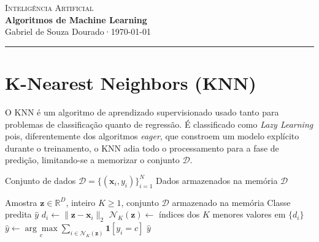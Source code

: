 \documentclass[12pt, a4paper]{article}
\theoremstyle{definition}
\theoremstyle{plain}
\theoremstyle{remark}
\newcommand{\docauthor}{Gabriel de Souza Dourado}
\newcommand{\doctitle}{Algoritmos de Machine Learning}
\newcommand{\docsubtitle}{Inteligência Artificial}
\newcommand{\docdate}{\today}
\begin{document}
\begin{center}
  {\large \textcolor{mainblue}{\textsc{\docsubtitle}}}\\[0.4em]
  {\LARGE \textbf{\doctitle}}\\[0.6em]
  {\small \docauthor \quad·\quad \docdate}
  \vspace{0.4em}
  \hrule
\end{center}

\vspace{1em}


\section{K-Nearest Neighbors (KNN)}

O KNN é um algoritmo de aprendizado supervisionado usado tanto para problemas de classificação quanto de regressão. 
É classificado como \textit{Lazy Learning} pois, diferentemente dos algoritmos \textit{eager}, que constroem um modelo 
explícito durante o treinamento, o KNN adia todo o processamento para a fase de predição, limitando-se a memorizar o 
conjunto $\mathcal{D}$.
 
\begin{algorithm}[H]
  \caption{KNN-Treino}
  \begin{algorithmic}[1]
    \Require Conjunto de dados $\mathcal{D} = \{(\mathbf{x}_i, y_i)\}_{i=1}^{N}$
    \Ensure  Dados armazenados na memória
    \State \Return $\mathcal{D}$
  \end{algorithmic}
\end{algorithm}
 
\begin{algorithm}[H]
  \caption{KNN-Predição (Classificação)}
  \begin{algorithmic}[1]
    \Require Amostra $\mathbf{z} \in \mathbb{R}^{D}$, inteiro $K \geq 1$,
             conjunto $\mathcal{D}$ armazenado na memória
    \Ensure  Classe predita $\hat{y}$
      \State $d_i \gets \|\mathbf{z} - \mathbf{x}_i\|_2$
    \EndFor
    \State $\mathcal{N}_K(\mathbf{z}) \gets$ índices dos $K$ menores valores em $\{d_i\}$
    \State $\hat{y} \gets \underset{c}{\arg\max}
           \displaystyle\sum_{i \in \mathcal{N}_K(\mathbf{z})} \mathbf{1}[y_i = c]$
    \State \Return $\hat{y}$
  \end{algorithmic}
\end{algorithm}
\end{document}
